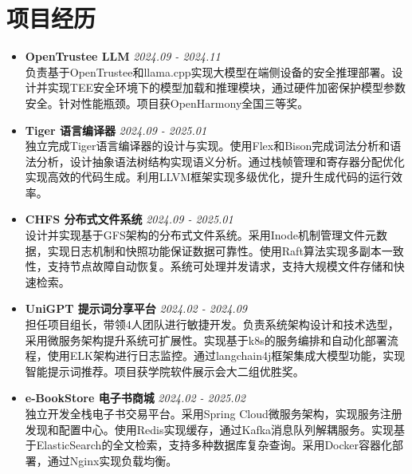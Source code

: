 \documentclass[a4paper]{article}
\begin{document}
\section*{项目经历}
\begin{itemize}[leftmargin=*,label={},itemsep=0.5em,topsep=0.2em]
\item \textbf{OpenTrustee LLM} \hfill \textit{2024.09 - 2024.11}\\
负责基于OpenTrustee和llama.cpp实现大模型在端侧设备的安全推理部署。设计并实现TEE安全环境下的模型加载和推理模块，通过硬件加密保护模型参数安全。针对性能瓶颈。项目获OpenHarmony全国三等奖。

\item \textbf{Tiger 语言编译器} \hfill \textit{2024.09 - 2025.01}\\
独立完成Tiger语言编译器的设计与实现。使用Flex和Bison完成词法分析和语法分析，设计抽象语法树结构实现语义分析。通过栈帧管理和寄存器分配优化实现高效的代码生成。利用LLVM框架实现多级优化，提升生成代码的运行效率。

\item \textbf{CHFS 分布式文件系统} \hfill \textit{2024.09 - 2025.01}\\
设计并实现基于GFS架构的分布式文件系统。采用Inode机制管理文件元数据，实现日志机制和快照功能保证数据可靠性。使用Raft算法实现多副本一致性，支持节点故障自动恢复。系统可处理并发请求，支持大规模文件存储和快速检索。

\item \textbf{UniGPT 提示词分享平台} \hfill \textit{2024.02 - 2024.09}\\
担任项目组长，带领4人团队进行敏捷开发。负责系统架构设计和技术选型，采用微服务架构提升系统可扩展性。实现基于k8s的服务编排和自动化部署流程，使用ELK架构进行日志监控。通过langchain4j框架集成大模型功能，实现智能提示词推荐。项目获学院软件展示会大二组优胜奖。

\item \textbf{e-BookStore 电子书商城} \hfill \textit{2024.02 - 2025.02}\\
独立开发全栈电子书交易平台。采用Spring Cloud微服务架构，实现服务注册发现和配置中心。使用Redis实现缓存，通过Kafka消息队列解耦服务。实现基于ElasticSearch的全文检索，支持多种数据库复杂查询。采用Docker容器化部署，通过Nginx实现负载均衡。
\end{itemize}
\end{document}
